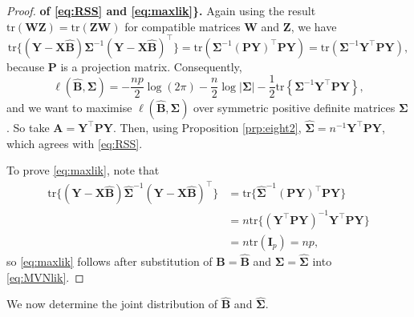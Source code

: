 \documentclass[]{book}
\theoremstyle{definition}
\theoremstyle{definition}
\theoremstyle{definition}
\theoremstyle{remark}
\begin{document}
\begin{proof}
{}\textbf{of \eqref{eq:RSS} and \eqref{eq:maxlik}\}.} Again using the result \(\text{tr}(\boldsymbol W\boldsymbol Z)=\text{tr}(\boldsymbol Z\boldsymbol W)\) for compatible matrices \(\boldsymbol W\) and \(\boldsymbol Z\), we have
\[
\text{tr}\{(\boldsymbol Y-\boldsymbol X\hat{\boldsymbol B}) \boldsymbol \Sigma^{-1}(\boldsymbol Y-\boldsymbol X\hat{\boldsymbol B})^\top\}=\text{tr}(\boldsymbol \Sigma^{-1}(\boldsymbol P\boldsymbol Y)^\top \boldsymbol P\boldsymbol Y)=\text{tr}(\boldsymbol \Sigma^{-1} \boldsymbol Y^\top \boldsymbol P\boldsymbol Y),
\]
because \(\boldsymbol P\) is a projection matrix. Consequently,
\[
\ell(\hat{\boldsymbol B},\boldsymbol \Sigma)=-\frac{np}{2}\log(2\pi)-\frac{n}{2}\log \vert \boldsymbol \Sigma\vert -\frac{1}{2} \text{tr}
\left \{ \boldsymbol \Sigma^{-1}\boldsymbol Y^\top \boldsymbol P\boldsymbol Y\right \},
\]
and we want to maximise \(\ell(\hat{\boldsymbol B}, \boldsymbol \Sigma)\) over symmetric positive definite matrices \(\boldsymbol \Sigma\). So take \(\boldsymbol A=\boldsymbol Y^\top \boldsymbol P\boldsymbol Y\). Then, using Proposition \ref{prp:eight2}, \(\hat{\boldsymbol \Sigma} = n^{-1}\boldsymbol Y^\top \boldsymbol P\boldsymbol Y\), which agrees with \eqref{eq:RSS}.

To prove \eqref{eq:maxlik}, note that
\begin{align*}
\text{tr}\{(\boldsymbol Y-\boldsymbol X\hat{\boldsymbol B}) \hat{\boldsymbol \Sigma}^{-1}(\boldsymbol Y-\boldsymbol X\hat{\boldsymbol B})^\top \}
&=\text{tr}\{\hat{\boldsymbol \Sigma}^{-1} (\boldsymbol P\boldsymbol Y)^\top \boldsymbol P\boldsymbol Y\}\\
&= n \text{tr}\{(\boldsymbol Y^\top \boldsymbol P\boldsymbol Y)^{-1} \boldsymbol Y^\top \boldsymbol P\boldsymbol Y\}\\
&=n\text{tr}(\boldsymbol I_p)=np,
\end{align*}
so \eqref{eq:maxlik} follows after substitution of \(\boldsymbol B=\hat{\boldsymbol B}\) and \(\boldsymbol \Sigma=\hat{\boldsymbol \Sigma}\) into \eqref{eq:MVNlik}.
\end{proof}

We now determine the joint distribution of \(\hat{\boldsymbol B}\) and \(\hat{\boldsymbol \Sigma}\).
\end{document}
